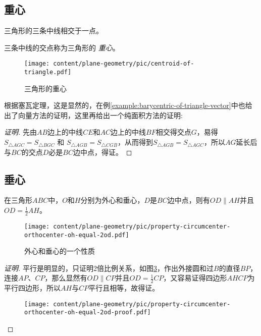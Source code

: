 \subsection{重心}
\label{sec:triangle-centroid}

\begin{theorem}
  三角形的三条中线相交于一点。
\end{theorem}


三条中线的交点称为三角形的 \emph{重心}。

\begin{figure}[htbp]
\centering
\texttt{[image: content/plane-geometry/pic/centroid-of-triangle.pdf]}
\caption{三角形的重心}
\label{fig:centroid-of-triangle}
\end{figure}

根据塞瓦定理，这是显然的，在例\ref{example:barycentric-of-triangle-vector}中也给出了向量方法的证明，这里再给出一个纯面积方法的证明:
\begin{proof}[证明]
  先由$AB$边上的中线$CE$和$AC$边上的中线$BF$相交得交点$G$，易得$S_{\triangle AGC} = S_{\triangle BGC}$ 和 $S_{\triangle AGB} = S_{\triangle CGB}$，从而得到$S_{\triangle AGB} = S_{\triangle AGC}$，所以$AG$延长后与$BC$的交点$D$必是$BC$边中点，得证。
\end{proof}

\subsection{垂心}
\label{sec:triangle-orthocentre}

\begin{property}
  \label{property:circumcenter-orthocenter-ah-equal-2od}
  在三角形$ABC$中，$O$和$H$分别为外心和垂心，$D$是$BC$边中点，则有$OD \parallel AH$并且$OD = \frac{1}{2} AH$。
\end{property}

\begin{figure}[htbp]
\centering
\texttt{[image: content/plane-geometry/pic/property-circumcenter-orthocenter-oh-equal-2od.pdf]}
\caption{外心和垂心的一个性质}
\label{fig:property-circumcenter-orthocenter-oh-equal-2od}
\end{figure}

\begin{proof}[证明]
  平行是明显的，只证明2倍比例关系，如图\ref{fig:property-circumcenter-orthocenter-oh-equal-2od-proof}，作出外接圆和过$B$的直径$BP$，连接$AP$、$CP$，那么显然有$OD \parallel CP$并且$OD=\frac{1}{2}CP$，又容易证得四边形$AHCP$为平行四边形，所以$AH$与$CP$平行且相等，故得证。

\begin{figure}[htbp]
\centering
\texttt{[image: content/plane-geometry/pic/property-circumcenter-orthocenter-oh-equal-2od-proof.pdf]}
\caption{}
\label{fig:property-circumcenter-orthocenter-oh-equal-2od-proof}
\end{figure}

\end{proof}

